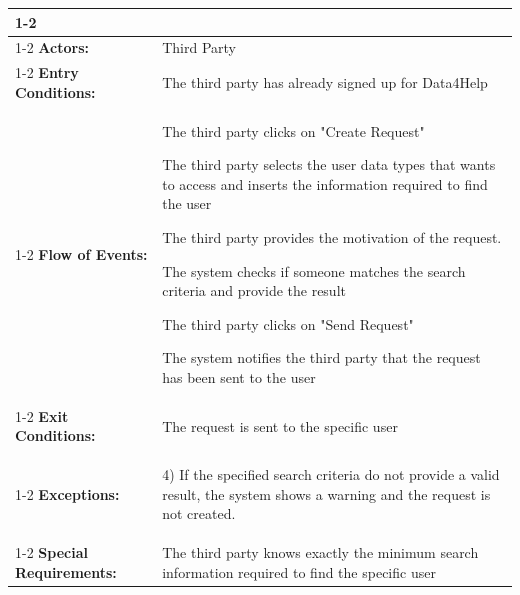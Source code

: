 \begin{table}[H]
	\centering
	{\renewcommand{\arraystretch}{1.5}%
		\begin{tabular}{|@{\hspace{2em}} p{4cm} @{}| p{11cm} @{\qquad}|}
			\cline{1-2}
			\multicolumn{2}{|c|}{\textbf{Make a Request}} \\ \cline{1-2}
			\textbf{Actors:} & Third Party \\ \cline{1-2}
			\textbf{Entry Conditions:} &  The third party has already signed up for Data4Help  \\ \cline{1-2}
			\textbf{Flow of Events:} & 
			\begin{enumerate}[itemsep=-0.2em, topsep=0em]
				{\small\item The third party clicks on "Create Request"
				\item The third party selects the user data types that wants to access and inserts the information required to find the user
				\item The third party provides the motivation of the request.
				\item The system checks if someone matches the search criteria and provide the result
				\item The third party clicks on "Send Request"
				\item The system notifies the third party that the request has been sent to the user}
			\end{enumerate}\\ \cline{1-2}
			\textbf{Exit Conditions:} & The request is sent to the specific user\\ \cline{1-2}
			\textbf{Exceptions:} & 
			\begin{itemize}[topsep=-2em, itemsep=-0.2em]
				{\small\item 4) If the specified search criteria do not provide a valid result, the system shows a warning and the request is not created.}
			\end{itemize} \\ \cline{1-2}
			\textbf{Special Requirements:} & The third party knows exactly the minimum search information required to find the specific user \\ \hline
	\end{tabular}} \quad
\end{table}

